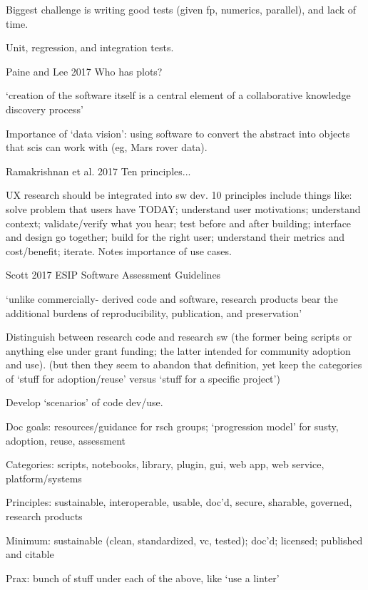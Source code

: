 \documentclass[12pt]{amsart}
\begin{document}
Biggest challenge is writing good tests (given fp, numerics, parallel), and lack of time.

Unit, regression, and integration tests.







Paine and Lee 2017 Who has plots?

`creation of the software itself is a central element of a collaborative knowledge discovery process'

Importance of `data vision': using software to convert the abstract into objects that scis can work with (eg, Mars rover data).


Ramakrishnan et al. 2017 Ten principles...

UX research should be integrated into sw dev. 10 principles include things like: solve problem that users have TODAY; understand user motivations; understand context; validate/verify what you hear; test before and after building; interface and design go together; build for the right user; understand their metrics and cost/benefit; iterate. Notes importance of use cases.



Scott 2017 ESIP Software Assessment Guidelines

`unlike commercially- derived code and software, research products bear the additional burdens of reproducibility, publication, and preservation'

Distinguish between research code and research sw (the former being scripts or anything else under grant funding; the latter intended for community adoption and use). (but then they seem to abandon that definition, yet keep the categories of `stuff for adoption/reuse' versus `stuff for a specific project')

Develop `scenarios' of code dev/use. 

Doc goals: resources/guidance for rsch groups; `progression model' for susty, adoption, reuse, assessment

Categories: scripts, notebooks, library, plugin, gui, web app, web service, platform/systems

Principles: sustainable, interoperable, usable, doc'd, secure, sharable, governed, research products

Minimum: sustainable (clean, standardized, vc, tested); doc'd; licensed; published and citable

Prax: bunch of stuff under each of the above, like `use a linter'
\end{document}
